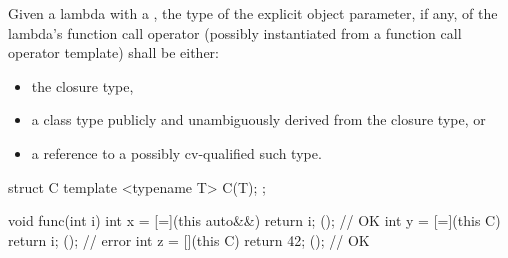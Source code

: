 \pnum
Given a lambda with a ,
the type of the explicit object parameter, if any,
of the lambda's function call operator
(possibly instantiated from a function call operator template)
shall be either:
\begin{itemize}
\item
the closure type,
\item
a class type publicly and unambiguously derived from the closure type, or
\item
a reference to a possibly cv-qualified such type.
\end{itemize}
\begin{example}
\begin{codeblock}
struct C {
  template <typename T>
  C(T);
};

void func(int i) {
  int x = [=](this auto&&) { return i; }();     // OK
  int y = [=](this C) { return i; }();          // error
  int z = [](this C) { return 42; }();          // OK
}
\end{codeblock}
\end{example}

